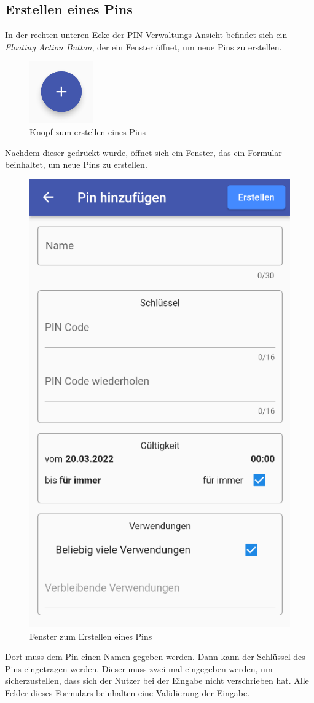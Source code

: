 \subsection{Erstellen eines Pins}
In der rechten unteren Ecke der PIN-Verwaltungs-Ansicht befindet sich ein \textit{Floating Action Button},
der ein Fenster öffnet, um neue Pins zu erstellen.

\begin{figure}[H]
    \begin{center}
        \includegraphics[width=.1\textwidth]{images/mobile/CreatePinButton.png}
        \caption{Knopf zum erstellen eines Pins}
    \end{center}
\end{figure}

Nachdem dieser gedrückt wurde, öffnet sich ein Fenster, das ein Formular beinhaltet, um neue Pins zu erstellen.

\begin{figure}[H]
    \begin{center}
        \includegraphics[width=.45\textwidth]{images/mobile/CreatePin.png}
        \caption{Fenster zum Erstellen eines Pins}
    \end{center}
\end{figure}

Dort muss dem Pin einen Namen gegeben werden.
Dann kann der Schlüssel des Pins eingetragen werden. Dieser muss zwei mal eingegeben werden, um sicherzustellen,
dass sich der Nutzer bei der Eingabe nicht verschrieben hat.
Alle Felder dieses Formulars beinhalten eine Validierung der Eingabe.

